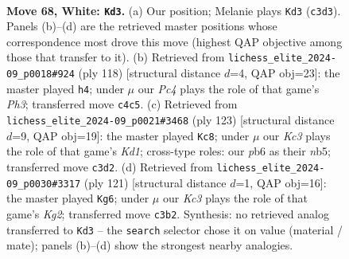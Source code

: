 \documentclass[11pt]{article}
\begin{document}
\clearpage

\begin{figure}[p]\centering
\begin{subfigure}{0.46\textwidth}\centering
\resizebox{\linewidth}{!}{%
\newchessgame
\chessboard[
  setfen={8/8/pp6/7k/q1P5/2K5/8/8 w - - 4 68},
  showmover=false,
  pgfstyle=straightmove, color=movearrow, markmove={c3-d3}
]}
\caption{}
\end{subfigure}\hfill
\begin{subfigure}{0.46\textwidth}\centering
\resizebox{\linewidth}{!}{%
\newchessgame
\chessboard[
  setfen={8/8/3k4/5q1p/8/4K2P/8/8 w - - 0 60},
  showmover=false,
  pgfstyle=straightmove, color=movearrow, markmove={h3-h4}
]}
\caption{}
\end{subfigure}
\\[4pt]
\begin{subfigure}{0.46\textwidth}\centering
\resizebox{\linewidth}{!}{%
\newchessgame
\chessboard[
  setfen={3k4/5Q2/8/1N5p/7P/5K2/8/8 b - - 8 62},
  showmover=false,
  pgfstyle=straightmove, color=movearrow, markmove={d8-c8}
]}
\caption{}
\end{subfigure}\hfill
\begin{subfigure}{0.46\textwidth}\centering
\resizebox{\linewidth}{!}{%
\newchessgame
\chessboard[
  setfen={8/6k1/4Qp2/8/5PP1/8/6K1/8 b - - 1 61},
  showmover=false,
  pgfstyle=straightmove, color=movearrow, markmove={g7-g6}
]}
\caption{}
\end{subfigure}
\caption{\textbf{Move 68, White: \texttt{Kd3}.} (a) Our position; Melanie plays \texttt{Kd3} (\texttt{c3d3}). Panels (b)--(d) are the retrieved master positions whose correspondence most drove this move (highest QAP objective among those that transfer to it). (b) Retrieved from \texttt{lichess\_elite\_2024-09\_p0018\#924} (ply 118) [structural distance $d$=4, QAP obj=23]: the master played \texttt{h4}; under $\mu$ our \emph{Pc4} plays the role of that game's \emph{Ph3}; transferred move \texttt{c4c5}. (c) Retrieved from \texttt{lichess\_elite\_2024-09\_p0021\#3468} (ply 123) [structural distance $d$=9, QAP obj=19]: the master played \texttt{Kc8}; under $\mu$ our \emph{Kc3} plays the role of that game's \emph{Kd1}; cross-type roles: our \emph{p}b6 as their \emph{n}b5; transferred move \texttt{c3d2}. (d) Retrieved from \texttt{lichess\_elite\_2024-09\_p0030\#3317} (ply 121) [structural distance $d$=1, QAP obj=16]: the master played \texttt{Kg6}; under $\mu$ our \emph{Kc3} plays the role of that game's \emph{Kg2}; transferred move \texttt{c3b2}. Synthesis: no retrieved analog transferred to \texttt{Kd3} -- the \texttt{search} selector chose it on value (material / mate); panels (b)--(d) show the strongest nearby analogies.}
\label{fig:thought-m134}
\end{figure}
\end{document}
